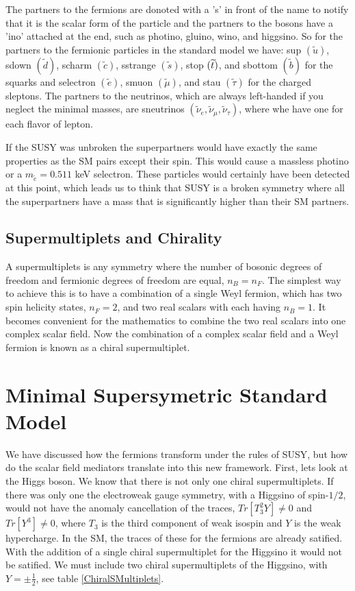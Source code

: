 The partners to the fermions are donoted with a 's' in front of the name to notify that it is the scalar form of the particle and the partners to the bosons have a 'ino' attached at the end, such as photino, gluino, wino, and higgsino. So for the partners to the fermionic particles in the standard model we have: sup $(\widetilde{u})$, sdown $(\widetilde{d})$, scharm $(\widetilde{c})$, sstrange $(\widetilde{s})$, stop $(\widetilde{t} )$, and sbottom $(\widetilde{b})$ for the squarks and selectron $(\widetilde{e})$, smuon $(\widetilde{\mu})$, and stau $(\widetilde{\tau})$ for the charged sleptons. The partners to the neutrinos, which are always left-handed if you neglect the minimal masses, are sneutrinos $(\widetilde{\nu}_e, \widetilde{\nu}_\mu, \widetilde{\nu}_\tau)$, where whe have one for each flavor of lepton. 

If the SUSY was unbroken the superpartners would have exactly the same properties as the SM pairs except their spin. This would cause a massless photino or a $m_{\widetilde{e}}=0.511$ keV selectron. These particles would certainly have been detected at this point, which leads us to think that SUSY is a broken symmetry where all the superpartners have a mass that is significantly higher than their SM partners. 

\subsection{Supermultiplets and Chirality}
\label{subsec:chiral}

A supermultiplets is any symmetry where the number of bosonic degrees of freedom and fermionic degrees of freedom are equal, $n_B=n_F$. The simplest  way to achieve this is to have a combination of a single Weyl fermion, which has two spin helicity states, $n_F=2$, and two real scalars with each having $n_B=1$. It becomes convenient for the mathematics to combine the two real scalars into one complex scalar field. Now the combination of a complex scalar field and a Weyl fermion is known as a chiral supermultiplet. 

\section{Minimal Supersymetric Standard Model}
\label{sec:MSSM}

We have discussed how the fermions transform under the rules of SUSY, but how do the scalar field mediators translate into this new framework. First, lets look at the Higgs boson. We know that there is not only one chiral supermultiplets. If there was only one the electroweak gauge symmetry, with a Higgsino of spin-$1/2$, would not have the anomaly cancellation of the traces, $Tr[T^2_3Y]\neq0$ and $Tr[Y^3]\neq0$, where $T_3$ is the third component of weak isospin and $Y$ is the weak hypercharge. In the SM, the traces of these for the fermions are already satified. With the addition of a single chiral supermultiplet for the Higgsino it would not be satified.  We must include two chiral supermultiplets of the Higgsino, with $Y=\pm\frac{1}{2}$, see table \ref{ChiralSMultiplets}. 

